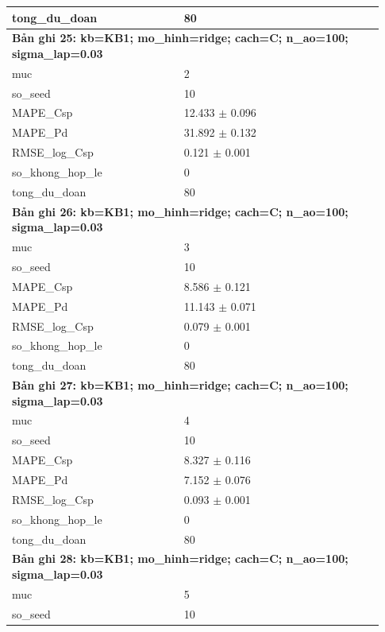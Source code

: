 \begin{longtable}{p{0.43\linewidth}p{0.50\linewidth}}
tong\_\allowbreak du\_\allowbreak doan & 80 \\
\midrule
\multicolumn{2}{p{0.95\linewidth}}{\textbf{Bản ghi 25: kb=KB1; mo\_hinh=ridge; cach=C; n\_ao=100; sigma\_lap=0.03}} \\
muc & 2 \\
so\_\allowbreak seed & 10 \\
MAPE\_\allowbreak Csp & 12.433 $\pm$ 0.096 \\
MAPE\_\allowbreak Pd & 31.892 $\pm$ 0.132 \\
RMSE\_\allowbreak log\_\allowbreak Csp & 0.121 $\pm$ 0.001 \\
so\_\allowbreak khong\_\allowbreak hop\_\allowbreak le & 0 \\
tong\_\allowbreak du\_\allowbreak doan & 80 \\
\midrule
\multicolumn{2}{p{0.95\linewidth}}{\textbf{Bản ghi 26: kb=KB1; mo\_hinh=ridge; cach=C; n\_ao=100; sigma\_lap=0.03}} \\
muc & 3 \\
so\_\allowbreak seed & 10 \\
MAPE\_\allowbreak Csp & 8.586 $\pm$ 0.121 \\
MAPE\_\allowbreak Pd & 11.143 $\pm$ 0.071 \\
RMSE\_\allowbreak log\_\allowbreak Csp & 0.079 $\pm$ 0.001 \\
so\_\allowbreak khong\_\allowbreak hop\_\allowbreak le & 0 \\
tong\_\allowbreak du\_\allowbreak doan & 80 \\
\midrule
\multicolumn{2}{p{0.95\linewidth}}{\textbf{Bản ghi 27: kb=KB1; mo\_hinh=ridge; cach=C; n\_ao=100; sigma\_lap=0.03}} \\
muc & 4 \\
so\_\allowbreak seed & 10 \\
MAPE\_\allowbreak Csp & 8.327 $\pm$ 0.116 \\
MAPE\_\allowbreak Pd & 7.152 $\pm$ 0.076 \\
RMSE\_\allowbreak log\_\allowbreak Csp & 0.093 $\pm$ 0.001 \\
so\_\allowbreak khong\_\allowbreak hop\_\allowbreak le & 0 \\
tong\_\allowbreak du\_\allowbreak doan & 80 \\
\midrule
\multicolumn{2}{p{0.95\linewidth}}{\textbf{Bản ghi 28: kb=KB1; mo\_hinh=ridge; cach=C; n\_ao=100; sigma\_lap=0.03}} \\
muc & 5 \\
so\_\allowbreak seed & 10 \\

\end{longtable}
